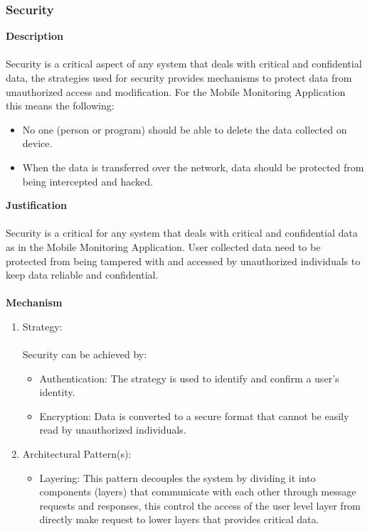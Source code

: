 \documentclass[hidelinks, 12pt, oneside]{article}
\begin{document}
			\subsubsection*{Security}
				\textbf{Description} \\\\
				Security is a critical aspect of any system that deals with critical and confidential data, the strategies used for security provides mechanisms to protect data from unauthorized access and modification. For the Mobile Monitoring Application this means the following:
				\begin{itemize}
					\item No one (person or program) should be able to delete the data collected on device.
					\item When the data is transferred over the network, data should be protected from being intercepted and hacked.    
				\end{itemize}
				\textbf{Justification} \\\\
				Security is a critical for any system that deals with critical and confidential data as in the Mobile Monitoring Application. User collected data need to be protected from being tampered with and accessed by unauthorized individuals to keep data reliable and confidential.\\\\
				\textbf{Mechanism}
				\begin{enumerate}
					\item Strategy: \\\\
						Security can be achieved by:
						\begin{itemize}
							\item Authentication: The strategy is used to identify and confirm a user's identity.  
							\item Encryption: Data is converted to a secure format that cannot be easily read by unauthorized individuals. 
						\end{itemize}
					\item Architectural Pattern(s):
						\begin{itemize}
							\item Layering: This pattern decouples the system by dividing it into components (layers) that communicate with each other through message requests and responses, this control the access of the user level layer from directly make request to lower layers that provides critical data. 
						\end{itemize}
				\end{enumerate}		
\end{document}
